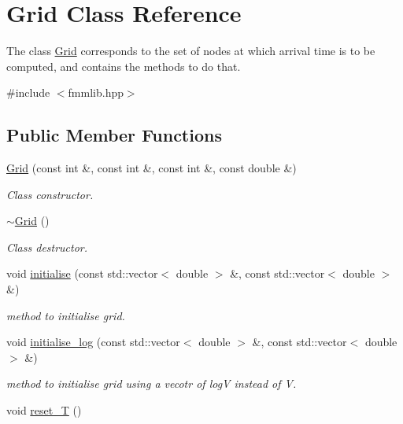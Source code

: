 \hypertarget{class_grid}{}\section{Grid Class Reference}
\label{class_grid}


The class \hyperlink{class_grid}{Grid} corresponds to the set of nodes at which arrival time is to be computed, and contains the methods to do that.  




{\ttfamily \#include $<$fmmlib.\+hpp$>$}

\subsection*{Public Member Functions}
\begin{DoxyCompactItemize}
\item 
\hyperlink{class_grid_acecf610ba3dbc40e048d00d4585e755a}{Grid} (const int \&, const int \&, const int \&, const double \&)
\begin{DoxyCompactList}\small\item\em Class constructor. \end{DoxyCompactList}\item 
\hypertarget{class_grid_a3661d0a7f998caaaf8627d7a67072116}{}\hyperlink{class_grid_a3661d0a7f998caaaf8627d7a67072116}{$\sim$\+Grid} ()\label{class_grid_a3661d0a7f998caaaf8627d7a67072116}

\begin{DoxyCompactList}\small\item\em Class destructor. \end{DoxyCompactList}\item 
void \hyperlink{class_grid_a525c06212728b34d29fef58a3a6d27f8}{initialise} (const std\+::vector$<$ double $>$ \&, const std\+::vector$<$ double $>$ \&)
\begin{DoxyCompactList}\small\item\em method to initialise grid. \end{DoxyCompactList}\item 
void \hyperlink{class_grid_a457b4cc1c95623e35e6d16a855b6781e}{initialise\+\_\+log} (const std\+::vector$<$ double $>$ \&, const std\+::vector$<$ double $>$ \&)
\begin{DoxyCompactList}\small\item\em method to initialise grid using a vecotr of log\+V instead of V. \end{DoxyCompactList}\item 
\hypertarget{class_grid_aac9b3a29c1b401552b312e9f26eda623}{}void \hyperlink{class_grid_aac9b3a29c1b401552b312e9f26eda623}{reset\+\_\+\+T} ()\label{class_grid_aac9b3a29c1b401552b312e9f26eda623}


\end{DoxyCompactItemize}
